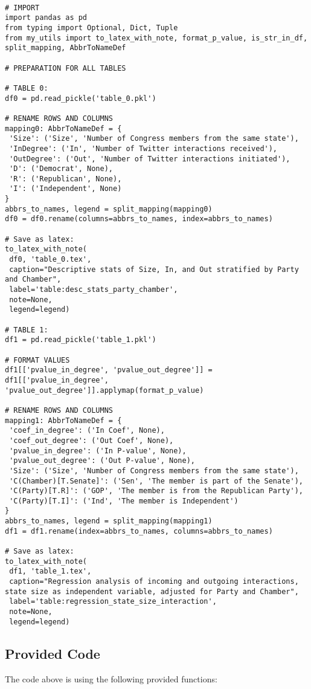 \documentclass[11pt]{article}
\begin{document}
\begin{verbatim}

# IMPORT
import pandas as pd
from typing import Optional, Dict, Tuple
from my_utils import to_latex_with_note, format_p_value, is_str_in_df, split_mapping, AbbrToNameDef

# PREPARATION FOR ALL TABLES

# TABLE 0:
df0 = pd.read_pickle('table_0.pkl')

# RENAME ROWS AND COLUMNS
mapping0: AbbrToNameDef = {
 'Size': ('Size', 'Number of Congress members from the same state'),
 'InDegree': ('In', 'Number of Twitter interactions received'),
 'OutDegree': ('Out', 'Number of Twitter interactions initiated'),
 'D': ('Democrat', None),
 'R': ('Republican', None),
 'I': ('Independent', None)
}
abbrs_to_names, legend = split_mapping(mapping0)
df0 = df0.rename(columns=abbrs_to_names, index=abbrs_to_names)

# Save as latex:
to_latex_with_note(
 df0, 'table_0.tex',
 caption="Descriptive stats of Size, In, and Out stratified by Party and Chamber", 
 label='table:desc_stats_party_chamber',
 note=None,
 legend=legend)

# TABLE 1:
df1 = pd.read_pickle('table_1.pkl')

# FORMAT VALUES
df1[['pvalue_in_degree', 'pvalue_out_degree']] = df1[['pvalue_in_degree', 'pvalue_out_degree']].applymap(format_p_value)

# RENAME ROWS AND COLUMNS
mapping1: AbbrToNameDef = {
 'coef_in_degree': ('In Coef', None),
 'coef_out_degree': ('Out Coef', None),
 'pvalue_in_degree': ('In P-value', None),
 'pvalue_out_degree': ('Out P-value', None),
 'Size': ('Size', 'Number of Congress members from the same state'),
 'C(Chamber)[T.Senate]': ('Sen', 'The member is part of the Senate'),
 'C(Party)[T.R]': ('GOP', 'The member is from the Republican Party'),
 'C(Party)[T.I]': ('Ind', 'The member is Independent')
}
abbrs_to_names, legend = split_mapping(mapping1)
df1 = df1.rename(index=abbrs_to_names, columns=abbrs_to_names)

# Save as latex:
to_latex_with_note(
 df1, 'table_1.tex',
 caption="Regression analysis of incoming and outgoing interactions, state size as independent variable, adjusted for Party and Chamber", 
 label='table:regression_state_size_interaction',
 note=None,
 legend=legend)

\end{verbatim}

\subsection{Provided Code}
The code above is using the following provided functions:
\end{document}
